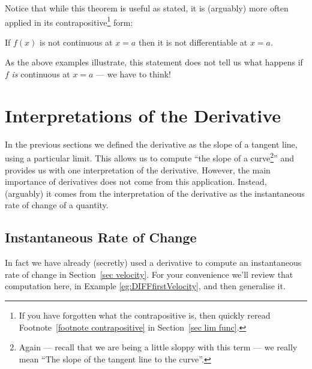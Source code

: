 Notice that while this theorem is useful as stated, it is (arguably) more often applied in its contrapositive\footnote{If you have forgotten what the contrapositive is, then quickly reread Footnote~\ref{footnote contrapositive} in Section~\ref{sec lim func}.} form:
\begin{theorem}
 If $f(x)$ is not continuous at $x=a$ then it is not differentiable at $x=a$.
\end{theorem}
As the above examples illustrate, this statement does not tell us what happens if $f$ \emph{is} continuous at $x=a$ --- we have to think!

\section{Interpretations of the Derivative}


In the previous sections we defined the derivative as the slope of a
tangent line, using a particular limit. This allows us to compute
``the slope of a curve\footnote{Again --- recall that we are being a little sloppy
with this term --- we really mean ``The slope of the tangent line to the curve''.}'' and
provides us with one interpretation of the derivative. However, the main importance of
derivatives does not come from this application. Instead, (arguably) it comes from the
interpretation of the derivative as the instantaneous rate of change of a quantity.

\subsection*{Instantaneous Rate of Change}


In fact we have already (secretly) used a derivative to compute an instantaneous rate of
change in Section~\ref{sec velocity}. For your convenience we'll review that computation
here, in Example \ref{eg:DIFFfirstVelocity}, and then generalise it.

